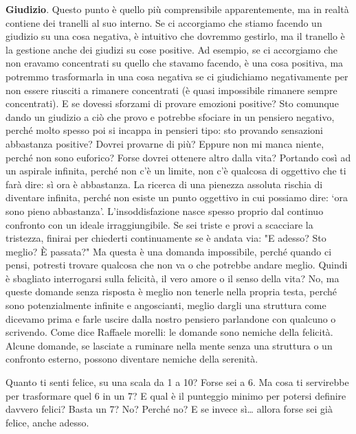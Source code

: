 \documentclass[12pt]{book} %
\begin{document}
\textbf{Giudizio}. Questo punto è quello più comprensibile apparentemente, ma in realtà contiene dei tranelli al suo interno. Se
ci accorgiamo che stiamo facendo un giudizio su una cosa negativa, è intuitivo che dovremmo gestirlo, ma il tranello è
la gestione anche dei giudizi su cose positive. Ad esempio, se ci accorgiamo che non eravamo concentrati su quello che
stavamo facendo, è una cosa positiva, ma potremmo trasformarla in una cosa negativa se ci giudichiamo negativamente per
non essere riusciti a rimanere concentrati (è quasi impossibile rimanere sempre concentrati). E se dovessi sforzami di
provare emozioni positive? Sto comunque dando un giudizio a ciò che provo e potrebbe sfociare in un pensiero negativo,
perché molto spesso poi si incappa in pensieri tipo: sto provando sensazioni abbastanza positive? Dovrei provarne di
più? Eppure non mi manca niente, perché non sono euforico? Forse dovrei ottenere altro dalla vita? Portando così ad un
aspirale infinita, perché non c'è un limite, non c'è qualcosa di oggettivo che ti farà dire: sì ora è abbastanza. 
La ricerca di una pienezza assoluta rischia di diventare infinita, perché non esiste un punto oggettivo in cui possiamo dire: ‘ora sono pieno abbastanza’. L’insoddisfazione nasce spesso proprio dal continuo confronto con un ideale irraggiungibile.
Se sei triste e provi a scacciare la tristezza, finirai per chiederti continuamente se è andata via: "E adesso? Sto meglio? È passata?" Ma questa è una domanda impossibile, perché quando ci pensi, potresti trovare qualcosa che non va o che potrebbe andare meglio.
Quindi è sbagliato interrogarsi sulla felicità, il vero
amore o il senso della vita? No, ma queste domande senza risposta è meglio non tenerle nella propria testa, perché sono
potenzialmente infinite e angoscianti, meglio dargli una struttura come dicevamo prima e farle uscire dalla nostro
pensiero parlandone con qualcuno o scrivendo. 
Come dice Raffaele morelli: le domande sono nemiche della felicità.
Alcune domande, se lasciate a ruminare nella mente senza una struttura o un confronto esterno, possono diventare nemiche della serenità.

Quanto ti senti felice, su una scala da 1 a 10? Forse sei a 6. Ma cosa ti servirebbe per trasformare quel 6 in un 7?
E qual è il punteggio minimo per potersi definire davvero felici? Basta un 7? No? Perché no?
E se invece sì… allora forse sei già felice, anche adesso.
\end{document}
